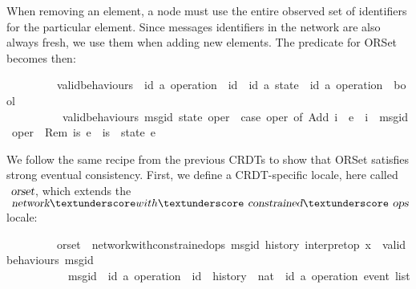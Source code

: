 When removing an element, a node must use the entire observed set of
identifiers for the particular element. Since messages identifiers in the
network are also always fresh, we use them when adding new elements. The
 predicate for ORSet becomes then:

\vspace{0.375em}
\begin{isabellebody}
\ \ \ \ \ \ \ \ \ valid{\isacharunderscore}behaviours\ {\isacharcolon}{\isacharcolon}\ {\isachardoublequoteopen}{\isacharparenleft}{\isacharparenleft}{\isacharprime}id{\isacharcomma}\ {\isacharprime}a{\isacharparenright}\ operation\ {\isasymRightarrow}\ {\isacharprime}id{\isacharparenright}\ {\isasymRightarrow}\ {\isacharparenleft}{\isacharprime}id{\isacharcomma}\ {\isacharprime}a{\isacharparenright}\ state\ {\isasymRightarrow}\ {\isacharparenleft}{\isacharprime}id{\isacharcomma}\ {\isacharprime}a{\isacharparenright}\ operation\ {\isasymRightarrow}\ bool{\isachardoublequoteclose}\ \isanewline
\ \ \ \ \ \ \ \ \ \ {\isachardoublequoteopen}valid{\isacharunderscore}behaviours\ msg{\isacharunderscore}id\ state\ oper\ {\isasymequiv}\ case\ oper\ of\ Add\ i\ \ e\ {\isasymRightarrow}\ i\ {\isacharequal}\ msg{\isacharunderscore}id\ oper\ {\isacharbar}\ Rem\ is\ e\ {\isasymRightarrow}\ is\ {\isacharequal}\ state\ e{\isachardoublequoteclose}
\end{isabellebody}
\vspace{0.375em}
We follow the same recipe from the previous CRDTs to show that ORSet satisfies
strong eventual consistency. First, we define a CRDT-specific locale, here
called $\isa{orset}$, which extends the
$\isa{network}{\isacharunderscore}with{\isacharunderscore}\isa{constrained}{\isacharunderscore}\isa{ops}$
locale:
\vspace{0.375em}
\begin{isabellebody}
\ \ \ \ \ \ \ \ \ orset\ {\isacharequal}\ network{\isacharunderscore}with{\isacharunderscore}constrained{\isacharunderscore}ops\ msg{\isacharunderscore}id\ history\ interpret{\isacharunderscore}op\ {\isachardoublequoteopen}{\isasymlambda}x{\isachardot}\ {\isacharbraceleft}{\isacharbraceright}{\isachardoublequoteclose}\ {\isachardoublequoteopen}valid{\isacharunderscore}behaviours\ msg{\isacharunderscore}id{\isachardoublequoteclose}\isanewline
\ \ \ \ \ \ \ \ \ \ \ msg{\isacharunderscore}id\ {\isacharcolon}{\isacharcolon}\ {\isachardoublequoteopen}{\isacharparenleft}{\isacharprime}id{\isacharcomma}\ {\isacharprime}a{\isacharparenright}\ operation\ {\isasymRightarrow}\ {\isacharprime}id{\isachardoublequoteclose}\ \ history\ {\isacharcolon}{\isacharcolon}\ {\isachardoublequoteopen}nat\ {\isasymRightarrow}\ {\isacharparenleft}{\isacharprime}id{\isacharcomma}\ {\isacharprime}a{\isacharparenright}\ operation\ event\ list{\isachardoublequoteclose}
\end{isabellebody}
\vspace{0.375em}


